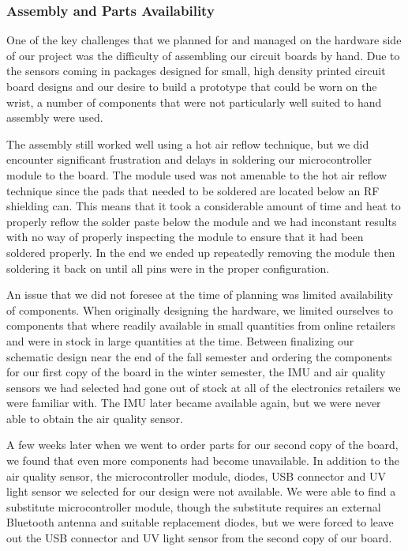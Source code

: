 \subsubsection{Assembly and Parts Availability}

One of the key challenges that we planned for and managed on the hardware side
of our project was the difficulty of assembling our circuit boards by hand. Due
to the sensors coming in packages designed for small, high
density printed circuit board designs and our desire to build a prototype that
could be worn on the wrist, a number of components that were not
particularly well suited to hand assembly were used.

The assembly still worked well using a hot air reflow
technique, but we did encounter significant frustration and delays in soldering
our microcontroller module to the board. The module used was not amenable to
the hot air reflow technique since the pads that needed to be soldered are
located below an RF shielding can. This means that it took a considerable amount
of time and heat to properly reflow the solder paste below the module and we had
inconstant results with no way of properly inspecting the module to ensure that
it had been soldered properly. In the end we ended up repeatedly removing
the module then soldering it back on until all pins were in the proper configuration.

An issue that we did not foresee at the time of planning was limited availability of
components. When originally designing the hardware, we limited ourselves to
components that where readily available in small quantities from online
retailers and were in stock in large quantities at the time. Between
finalizing our schematic design near the end of the fall semester and ordering
the components for our first copy of the board in the winter semester, the IMU
and air quality sensors we had selected had gone out of stock at all of the
electronics retailers we were familiar with. The IMU later became
available again, but we were never able to obtain the air quality sensor.

A few weeks later when we went to order parts for our second copy of the board,
we found that even more components had become unavailable. In addition to the
air quality sensor, the microcontroller module, diodes, USB connector and UV
light sensor we selected for our design were not available. We were
able to find a substitute microcontroller module, though the substitute requires
an external Bluetooth antenna and suitable replacement diodes, but we were
forced to leave out the USB connector and UV light sensor from the second
copy of our board.


